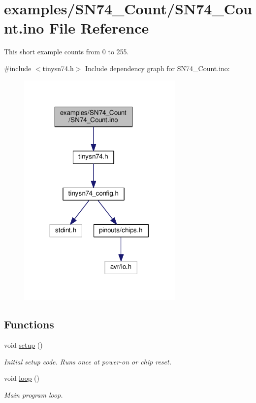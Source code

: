 \hypertarget{SN74__Count_8ino}{}\section{examples/\+S\+N74\+\_\+\+Count/\+S\+N74\+\_\+\+Count.ino File Reference}
\label{SN74__Count_8ino}


This short example counts from 0 to 255.  


{\ttfamily \#include $<$tinysn74.\+h$>$}\newline
Include dependency graph for S\+N74\+\_\+\+Count.\+ino\+:\nopagebreak
\begin{figure}[H]
\begin{center}
\leavevmode
\includegraphics[width=230pt]{SN74__Count_8ino__incl}
\end{center}
\end{figure}
\subsection*{Functions}
\begin{DoxyCompactItemize}
\item 
void \hyperlink{SN74__Count_8ino_a4fc01d736fe50cf5b977f755b675f11d}{setup} ()
\begin{DoxyCompactList}\small\item\em Initial setup code. Runs once at power-\/on or chip reset. \end{DoxyCompactList}\item 
void \hyperlink{SN74__Count_8ino_afe461d27b9c48d5921c00d521181f12f}{loop} ()
\begin{DoxyCompactList}\small\item\em Main program loop. \end{DoxyCompactList}\end{DoxyCompactItemize}
